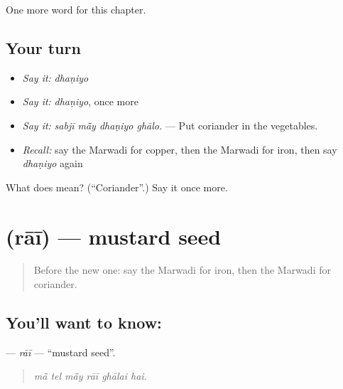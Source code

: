 \begin{grammarlens}[title={What you've built}]
One more word for this chapter.
\end{grammarlens}

\subsection*{Your turn}
\begin{itemize}
\raggedright
  \item \emph{Say it:} \emph{dhaṇiyo}
  \item \emph{Say it:} \emph{dhaṇiyo}, once more
  \item \emph{Say it:} \emph{sabjī mā̃y dhaṇiyo ghālo.} — Put coriander in the vegetables.
  \item \emph{Recall:} say the Marwadi for copper, then the Marwadi for iron, then say \emph{dhaṇiyo} again
\end{itemize}

\begin{tcolorbox}[breakable,colback=teal!4,colframe=teal!35!black,title={Before you move on}]
What does  mean? (\textquotedblleft{}Coriander\textquotedblright{}.) Say it once more.
\end{tcolorbox}
\section[\texorpdfstring{\mw{राई} (rāī)}{राई (rāī)}]{ (rāī) — mustard seed}

\label{lesson:MW-C185-rai}



\begin{quote}
Before the new one: say the Marwadi for iron, then the Marwadi for coriander.
\end{quote}

\subsection*{You'll want to know: }
\textbf{} — \emph{rāī} — \textquotedblleft{}mustard seed\textquotedblright{}.

\begin{quote}
     
\end{quote}

\begin{quote}
\emph{mā̃ tel mā̃y rāī ghālai hai.}
\end{quote}

